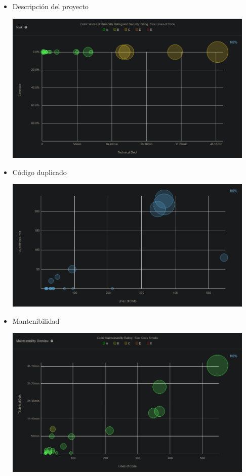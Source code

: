 \documentclass[preprint,12pt]{elsarticle}
\begin{document}
\begin{itemize}

		\item Descripción del proyecto
	\begin{center}
	\includegraphics[width=12cm]{./imagen/Screenshot_2020-10-30 Project Overview.png} 
	\end{center}

		\item Código duplicado
	\begin{center}
	\includegraphics[width=12cm]{./imagen/Screenshot_2020-10-30 Duplications Overview.png} 
	\end{center}

		\item Mantenibilidad
	\begin{center}
	\includegraphics[width=12cm]{./imagen/Screenshot_2020-10-30 Maintainability Overview.png} 
	\end{center}
	

\end{itemize}
\end{document}
